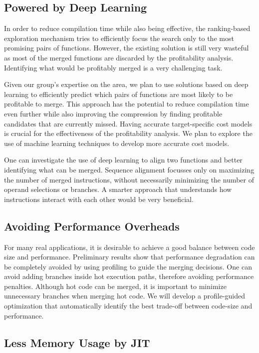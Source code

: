 \subsection{Powered by Deep Learning}

In order to reduce compilation time while also being effective, 
the ranking-based exploration mechanism tries to efficiently focus the search 
only to the most promising pairs of functions.
However, the existing solution is still very wasteful as most of the merged functions are
discarded by the profitability analysis.
Identifying what would be profitably merged is a very challenging task.

Given our group's expertise on the area, we plan to use solutions based on deep learning to efficiently predict which pairs of functions are most likely to be profitable to merge.
This approach has the potential to reduce compilation time even further while also improving the compression by finding profitable candidates that are currently missed.
Having accurate target-specific cost models is crucial for the effectiveness of the profitability analysis.
We plan to explore the use of machine learning techniques to develop more accurate cost models.

One can investigate the use of deep learning to align two functions and better identifying what can be merged.
Sequence alignment focusses only on maximizing the number of merged instructions,
without necessarily minimizing the number of operand selections or branches.
A smarter approach that understands how instructions interact with each other would be
very beneficial.


\subsection{Avoiding Performance Overheads}

For many real applications, it is desirable to achieve a good balance between code size and performance.
Preliminary results show that performance degradation can be completely avoided by using profiling to
guide the merging decisions.
One can avoid adding branches inside hot execution paths, therefore avoiding performance penalties.
Although hot code can be merged, it is important to minimize unnecessary branches when merging hot code.
We will develop a profile-guided optimization that automatically identify the best trade-off between code-size and performance.

\subsection{Less Memory Usage by JIT}

